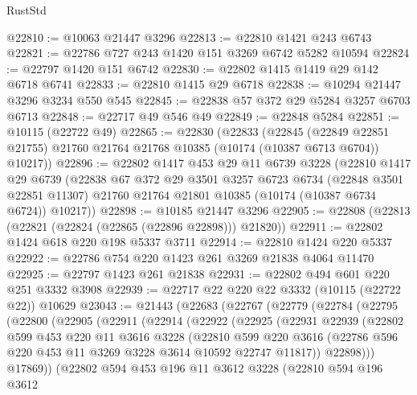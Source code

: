\begin{lexlean}{RustStd}
\begin{coremodule}
@22810 := @10063 @21447 @3296
@22813 := @22810 @1421 @243 @6743
@22821 := @22786 @727 @243 @1420 @151 @3269 @6742 @5282 @10594
@22824 := @22797 @1420 @151 @6742
@22830 := @22802 @1415 @1419 @29 @142 @6718 @6741
@22833 := @22810 @1415 @29 @6718
@22838 := @10294 @21447 @3296 @3234 @550 @545
@22845 := @22838 @57 @372 @29 @5284 @3257 @6703 @6713
@22848 := @22717 @49 @546 @49
@22849 := @22848 @5284
@22851 := @10115 (@22722 @49)
@22865 := @22830
    (@22833
      (@22845
        (@22849 @22851 @21755)
        @21760
        @21764
        @21768
        @10385
        (@10174 (@10387 @6713 @6704))
        @10217))
@22896 := @22802
    @1417
    @453
    @29
    @11
    @6739
    @3228
    (@22810
      @1417
      @29
      @6739
      (@22838
        @67
        @372
        @29
        @3501
        @3257
        @6723
        @6734
        (@22848 @3501 @22851 @11307)
        @21760
        @21764
        @21801
        @10385
        (@10174 (@10387 @6734 @6724))
        @10217))
@22898 := @10185 @21447 @3296
@22905 := @22808 (@22813 (@22821 (@22824 (@22865 (@22896 @22898))) @21820))
@22911 := @22802 @1424 @618 @220 @198 @5337 @3711
@22914 := @22810 @1424 @220 @5337
@22922 := @22786 @754 @220 @1423 @261 @3269 @21838 @4064 @11470
@22925 := @22797 @1423 @261 @21838
@22931 := @22802 @494 @601 @220 @251 @3332 @3908
@22939 := @22717 @22 @220 @22 @3332 (@10115 (@22722 @22)) @10629
@23043 := @21443
    (@22683
      (@22767
        (@22779
          (@22784
            (@22795
              (@22800
                (@22905
                  (@22911
                    (@22914
                      (@22922
                        (@22925
                          (@22931
                            @22939
                            (@22802
                              @599
                              @453
                              @220
                              @11
                              @3616
                              @3228
                              (@22810
                                @599
                                @220
                                @3616
                                (@22786 @596 @220 @453 @11 @3269 @3228 @3614 @10592 @22747 @11817))
                              @22898)))
                        @17869))
                    (@22802
                      @594
                      @453
                      @196
                      @11
                      @3612
                      @3228
                      (@22810
                        @594
                        @196
                        @3612

\end{coremodule}
\end{lexlean}
